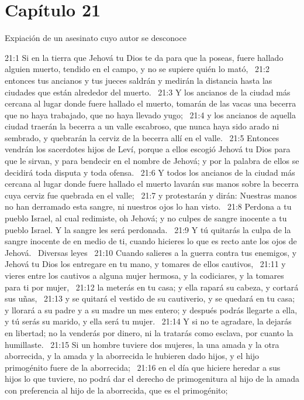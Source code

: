 \section*{Capítulo 21}
Expiación de un asesinato cuyo autor se desconoce  

21:1 Si en la tierra que Jehová tu Dios te da para que la poseas, fuere hallado alguien muerto, tendido en el campo, y no se supiere quién lo mató,  
21:2 entonces tus ancianos y tus jueces saldrán y medirán la distancia hasta las ciudades que están alrededor del muerto.  
21:3 Y los ancianos de la ciudad más cercana al lugar donde fuere hallado el muerto, tomarán de las vacas una becerra que no haya trabajado, que no haya llevado yugo;  
21:4 y los ancianos de aquella ciudad traerán la becerra a un valle escabroso, que nunca haya sido arado ni sembrado, y quebrarán la cerviz de la becerra allí en el valle.  
21:5 Entonces vendrán los sacerdotes hijos de Leví, porque a ellos escogió Jehová tu Dios para que le sirvan, y para bendecir en el nombre de Jehová; y por la palabra de ellos se decidirá toda disputa y toda ofensa.  
21:6 Y todos los ancianos de la ciudad más cercana al lugar donde fuere hallado el muerto lavarán sus manos sobre la becerra cuya cerviz fue quebrada en el valle;  
21:7 y protestarán y dirán: Nuestras manos no han derramado esta sangre, ni nuestros ojos lo han visto.  
21:8 Perdona a tu pueblo Israel, al cual redimiste, oh Jehová; y no culpes de sangre inocente a tu pueblo Israel. Y la sangre les será perdonada.  
21:9 Y tú quitarás la culpa de la sangre inocente de en medio de ti, cuando hicieres lo que es recto ante los ojos de Jehová.  
Diversas leyes  
21:10 Cuando salieres a la guerra contra tus enemigos, y Jehová tu Dios los entregare en tu mano, y tomares de ellos cautivos,  
21:11 y vieres entre los cautivos a alguna mujer hermosa, y la codiciares, y la tomares para ti por mujer,  
21:12 la meterás en tu casa; y ella rapará su cabeza, y cortará sus uñas,  
21:13 y se quitará el vestido de su cautiverio, y se quedará en tu casa; y llorará a su padre y a su madre un mes entero; y después podrás llegarte a ella, y tú serás su marido, y ella será tu mujer.  
21:14 Y si no te agradare, la dejarás en libertad; no la venderás por dinero, ni la tratarás como esclava, por cuanto la humillaste.  
21:15 Si un hombre tuviere dos mujeres, la una amada y la otra aborrecida, y la amada y la aborrecida le hubieren dado hijos, y el hijo primogénito fuere de la aborrecida;  
21:16 en el día que hiciere heredar a sus hijos lo que tuviere, no podrá dar el derecho de primogenitura al hijo de la amada con preferencia al hijo de la aborrecida, que es el primogénito;  
